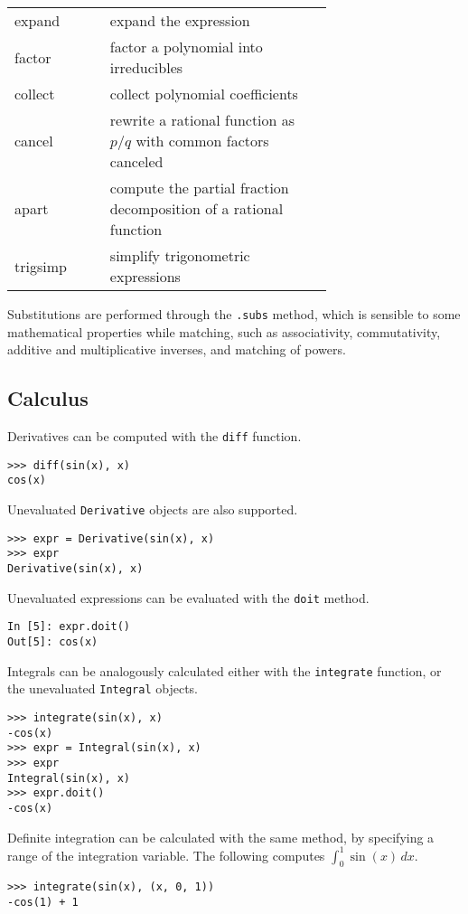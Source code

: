 \label{simplify-table}
\begin{tabular}{l|p{0.7\linewidth}}
expand & expand the expression \\
factor & factor a polynomial into irreducibles \\
collect & collect polynomial coefficients \\
cancel & rewrite a rational function as $p/q$ with common factors canceled \\
apart & compute the partial fraction decomposition of a rational function \\
trigsimp & simplify trigonometric expressions~\cite{fu2006automated} \\
\end{tabular}

Substitutions are performed through the \texttt{.subs} method, which is
sensible to some mathematical properties while matching, such as
associativity, commutativity, additive and multiplicative inverses, and
matching of powers.


\subsection{Calculus}


Derivatives can be computed with the \verb|diff| function.

\begin{verbatim}
>>> diff(sin(x), x)
cos(x)
\end{verbatim}

Unevaluated \verb|Derivative| objects are also supported.

\begin{verbatim}
>>> expr = Derivative(sin(x), x)
>>> expr
Derivative(sin(x), x)
\end{verbatim}

Unevaluated expressions can be evaluated with the \verb|doit| method.

\begin{verbatim}
In [5]: expr.doit()
Out[5]: cos(x)
\end{verbatim}

Integrals can be analogously calculated either with the \verb|integrate|
function, or the unevaluated \verb|Integral| objects.
\begin{verbatim}
>>> integrate(sin(x), x)
-cos(x)
>>> expr = Integral(sin(x), x)
>>> expr
Integral(sin(x), x)
>>> expr.doit()
-cos(x)
\end{verbatim}
Definite integration can be calculated with the same method, by specifying a
range of the integration variable. The following computes $\int_0^1\sin(x)\,dx$.
\begin{verbatim}
>>> integrate(sin(x), (x, 0, 1))
-cos(1) + 1
\end{verbatim}

